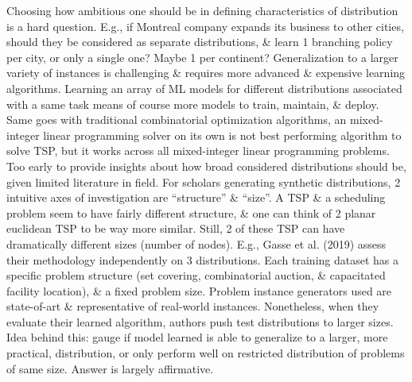 \documentclass{article}
\begin{document}
\begin{itemize}
\begin{itemize}
        Choosing how ambitious one should be in defining characteristics of distribution is a hard question. E.g., if Montreal company expands its business to other cities, should they be considered as separate distributions, \& learn 1 branching policy per city, or only a single one? Maybe 1 per continent? Generalization to a larger variety of instances is challenging \& requires more advanced \& expensive learning algorithms. Learning an array of ML models for different distributions associated with a same task means of course more models to train, maintain, \& deploy. Same goes with traditional combinatorial optimization algorithms, an mixed-integer linear programming solver on its own is not best performing algorithm to solve TSP, but it works across all mixed-integer linear programming problems. Too early to provide insights about how broad considered distributions should be, given limited literature in field. For scholars generating synthetic distributions, 2 intuitive axes of investigation are ``structure'' \& ``size''. A TSP \& a scheduling problem seem to have fairly different structure, \& one can think of 2 planar euclidean TSP to be way more similar. Still, 2 of these TSP can have dramatically different sizes (number of nodes). E.g., Gasse et al. (2019) assess their methodology independently on 3 distributions. Each training dataset has a specific problem structure (set covering, combinatorial auction, \& capacitated facility location), \& a fixed problem size. Problem instance generators used are state-of-art \& representative of real-world instances. Nonetheless, when they evaluate their learned algorithm, authors push test distributions to larger sizes. Idea behind this: gauge if model learned is able to generalize to a larger, more practical, distribution, or only perform well on restricted distribution of problems of same size. Answer is largely affirmative.


\end{itemize}
\end{itemize}
\end{document}
